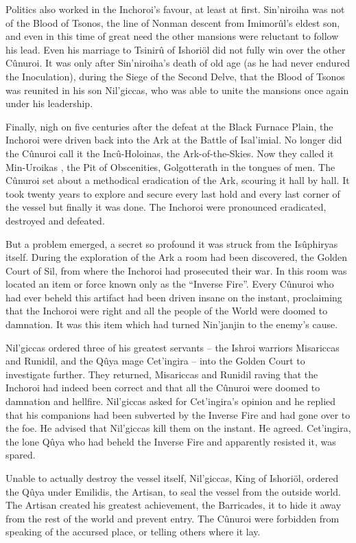 \documentclass[]{book}
\begin{document}
Politics also worked in the Inchoroi's favour, at least at first. Sin'niroiha was not of the
Blood of Tsonos, the line of Nonman descent from Imimorûl's eldest son, and even in
this time of great need the other mansions were reluctant to follow his lead. Even his
marriage to Tsinirû of Ishoriöl did not fully win over the other Cûnuroi. It was only
after Sin'niroiha's death of old age (as he had never endured the Inoculation), during
the Siege of the Second Delve, that the Blood of Tsonos was reunited in his son
Nil'giccas, who was able to unite the mansions once again under his leadership.

Finally, nigh on five centuries after the defeat at the Black Furnace Plain, the Inchoroi
were driven back into the Ark at the Battle of Isal'imial. No longer did the Cûnuroi call
it the Incû-Holoinas, the Ark-of-the-Skies. Now they called it Min-Uroikas , the Pit of
Obscenities, Golgotterath in the tongues of men. The Cûnuroi set about a methodical
eradication of the Ark, scouring it hall by hall. It took twenty years to explore and
secure every last hold and every last corner of the vessel but finally it was done. The
Inchoroi were pronounced eradicated, destroyed and defeated.

But a problem emerged, a secret so profound it was struck from the Isûphiryas itself.
During the exploration of the Ark a room had been discovered, the Golden Court of
Sil, from where the Inchoroi had prosecuted their war. In this room was located an
item or force known only as the ``Inverse Fire''. Every Cûnuroi who had ever beheld
this artifact had been driven insane on the instant, proclaiming that the Inchoroi were
right and all the people of the World were doomed to damnation. It was this item
which had turned Nin'janjin to the enemy's cause.

Nil'giccas ordered three of his greatest servants -- the Ishroi warriors Misariccas and
Runidil, and the Qûya mage Cet'ingira -- into the Golden Court to investigate further.
They returned, Misariccas and Runidil raving that the Inchoroi had indeed been
correct and that all the Cûnuroi were doomed to damnation and hellfire. Nil'giccas
asked for Cet'ingira's opinion and he replied that his companions had been subverted
by the Inverse Fire and had gone over to the foe. He advised that Nil'giccas kill them
on the instant. He agreed. Cet'ingira, the lone Qûya who had beheld the Inverse Fire
and apparently resisted it, was spared.

Unable to actually destroy the vessel itself, Nil'giccas, King of Ishoriöl, ordered the
Qûya under Emilidis, the Artisan, to seal the vessel from the outside world. The
Artisan created his greatest achievement, the Barricades, it to hide it away from the rest
of the world and prevent entry. The Cûnuroi were forbidden from speaking of the
accursed place, or telling others where it lay.
\end{document}
